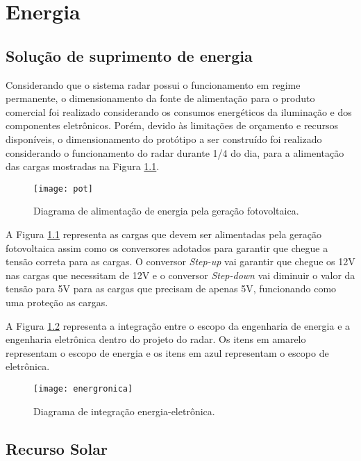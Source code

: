 \chapter{Energia}

\section{Solução de suprimento de energia}
Considerando que o sistema radar possui o funcionamento em regime permanente, o dimensionamento da fonte de alimentação para o produto comercial foi realizado considerando os consumos energéticos da iluminação e dos componentes eletrônicos. Porém, devido às limitações de orçamento e recursos disponíveis, o dimensionamento do protótipo a ser construído foi realizado considerando o funcionamento do radar durante 1/4 do dia, para a alimentação das cargas mostradas na Figura \ref{fig30}.

\begin{figure}[h!]
\centering \label{fig30}
\texttt{[image: pot]}
\caption{Diagrama de alimentação de energia pela geração fotovoltaica. }
\label{fig30}
\end{figure}

A Figura \ref{fig30} representa as cargas que devem ser alimentadas pela geração fotovoltaica assim como os conversores adotados para garantir que chegue a tensão correta para as cargas. O conversor \textit{Step-up} vai garantir que chegue os 12V nas cargas que necessitam de 12V e o conversor \textit{Step-down} vai diminuir o valor da tensão para 5V para as cargas que precisam de apenas 5V, funcionando como uma proteção as cargas.

A Figura \ref{fig31} representa a integração entre o escopo da engenharia de energia e a engenharia eletrônica dentro do projeto do radar. Os itens em amarelo representam o escopo de energia e os itens em azul representam o escopo de eletrônica.

\begin{figure}[h!]
\centering \label{fig31}
\texttt{[image: energronica]}
\caption{Diagrama de integração energia-eletrônica. }
\label{fig31}
\end{figure}
\newpage

\section{Recurso Solar}

